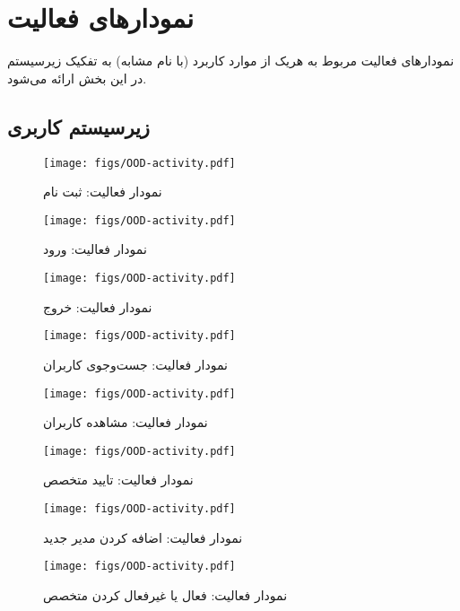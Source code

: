 \chapter{نمودارهای فعالیت}

نمودارهای فعالیت مربوط به هریک از موارد کاربرد (با نام مشابه) به تفکیک زیرسیستم در این بخش ارائه می‌شود.

\section{زیرسیستم کاربری}

\begin{figure}[ht!]
	\centering
	\texttt{[image: figs/OOD-activity.pdf]}
	\caption{نمودار فعالیت: ثبت نام}
\end{figure}
\FloatBarrier
\newpage

\begin{figure}
	\centering
	\texttt{[image: figs/OOD-activity.pdf]}
	\caption{نمودار فعالیت: ورود}
\end{figure}
\FloatBarrier
\newpage

\begin{figure}
	\centering
	\texttt{[image: figs/OOD-activity.pdf]}
	\caption{نمودار فعالیت: خروج}
\end{figure}
\FloatBarrier
\newpage

\begin{figure}
	\centering
	\texttt{[image: figs/OOD-activity.pdf]}
	\caption{نمودار فعالیت: جست‌وجوی کاربران}
\end{figure}
\FloatBarrier
\newpage

\begin{figure}
	\centering
	\texttt{[image: figs/OOD-activity.pdf]}
	\caption{نمودار فعالیت: مشاهده کاربران}
\end{figure}
\FloatBarrier
\newpage

\begin{figure}
	\centering
	\texttt{[image: figs/OOD-activity.pdf]}
	\caption{نمودار فعالیت: تایید متخصص}
\end{figure}
\FloatBarrier
\newpage

\begin{figure}
	\centering
	\texttt{[image: figs/OOD-activity.pdf]}
	\caption{نمودار فعالیت: اضافه کردن مدیر جدید}
\end{figure}
\FloatBarrier
\newpage

\begin{figure}
	\centering
	\texttt{[image: figs/OOD-activity.pdf]}
	\caption{نمودار فعالیت: فعال یا غیرفعال کردن متخصص}
\end{figure}
\FloatBarrier
\newpage

